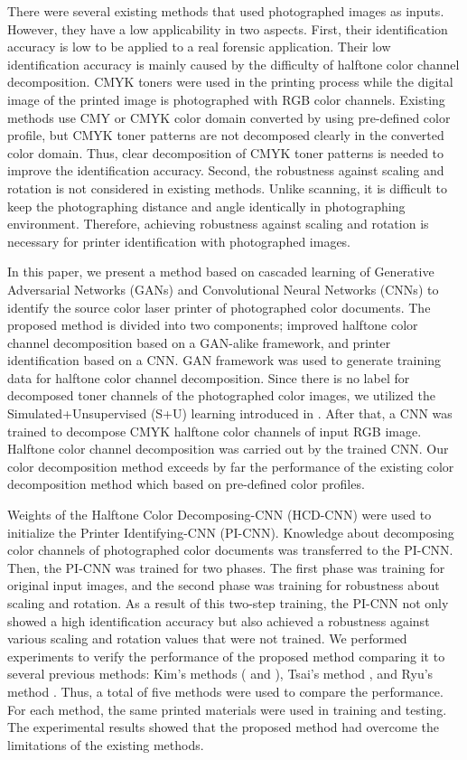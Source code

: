 \documentclass[5p, times]{elsarticle}
\begin{document}
There were several existing methods that used photographed images as inputs. However, they have a low applicability in two aspects. First, their identification accuracy is low to be applied to a real forensic application. Their low identification accuracy is mainly caused by the difficulty of halftone color channel decomposition. CMYK toners were used in the printing process while the digital image of the printed image is photographed with RGB color channels. Existing methods use CMY or CMYK color domain converted by using pre-defined color profile, but CMYK toner patterns are not decomposed clearly in the converted color domain. Thus, clear decomposition of CMYK toner patterns is needed to improve the identification accuracy. Second, the robustness against scaling and rotation is not considered in existing methods. Unlike scanning, it is difficult to keep the photographing distance and angle identically in photographing environment. Therefore, achieving robustness against scaling and rotation is necessary for printer identification with photographed images.

In this paper, we present a method based on cascaded learning of Generative Adversarial Networks (GANs) and Convolutional Neural Networks (CNNs) to identify the source color laser printer of photographed color documents. The proposed method is divided into two components; improved halftone color channel decomposition based on a GAN-alike framework, and printer identification based on a CNN. GAN framework was used to generate training data for halftone color channel decomposition. Since there is no label for decomposed toner channels of the photographed color images, we utilized the Simulated+Unsupervised (S+U) learning introduced in \cite{SimGan}. After that, a CNN was trained to decompose CMYK halftone color channels of input RGB image. Halftone color channel decomposition was carried out by the trained CNN. Our color decomposition method exceeds by far the performance of the existing color decomposition method which based on pre-defined color profiles.

Weights of the Halftone Color Decomposing-CNN (HCD-CNN) were used to initialize the Printer Identifying-CNN (PI-CNN). Knowledge about decomposing color channels of photographed color documents was transferred to the PI-CNN. Then, the PI-CNN was trained for two phases. The first phase was training for original input images, and the second phase was training for robustness about scaling and rotation. As a result of this two-step training, the PI-CNN not only showed a high identification accuracy but also achieved a robustness against various scaling and rotation values that were not trained. We performed experiments to verify the performance of the proposed method comparing it to several previous methods: Kim's methods (\cite{Kim1} and \cite{Kim2}), Tsai's method \cite{Tsai1}, and Ryu's method \cite{Ryu}. Thus, a total of five methods were used to compare the performance. For each method, the same printed materials were used in training and testing. The experimental results showed that the proposed method had overcome the limitations of the existing methods.
\end{document}

